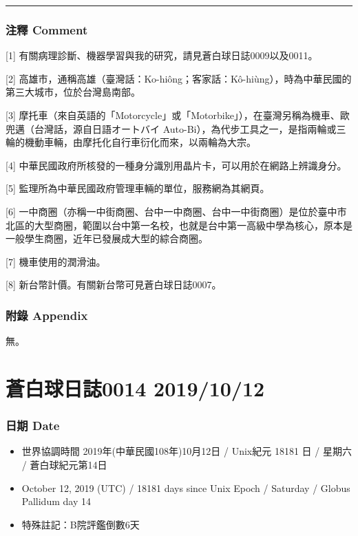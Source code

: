 \documentclass[
]{article}
\providecommand{\tightlist}{%
  \setlength{\itemsep}{0pt}\setlength{\parskip}{0pt}}
\begin{document}
\begin{center}\rule{0.5\linewidth}{\linethickness}\end{center}

\hypertarget{ux6ce8ux91cb-comment-6}{%
\subsubsection{注釋 Comment}\label{ux6ce8ux91cb-comment-6}}

{[}1{]} 有關病理診斷、機器學習與我的研究，請見蒼白球日誌0009以及0011。

{[}2{]}
高雄市，通稱高雄（臺灣話：Ko-hiông；客家話：Kô-hiùng），時為中華民國的第三大城市，位於台灣島南部。

{[}3{]}
摩托車（來自英語的「Motorcycle」或「Motorbike」），在臺灣另稱為機車、歐兜邁（台灣話，源自日語オートバイ
Auto-Bi），為代步工具之一，是指兩輪或三輪的機動車輛，由摩托化自行車衍化而來，以兩輪為大宗。

{[}4{]}
中華民國政府所核發的一種身分識別用晶片卡，可以用於在網路上辨識身分。

{[}5{]} 監理所為中華民國政府管理車輛的單位，服務網為其網頁。

{[}6{]}
一中商圈（亦稱一中街商圈、台中一中商圈、台中一中街商圈）是位於臺中市北區的大型商圈，範圍以台中第一名校，也就是台中第一高級中學為核心，原本是一般學生商圈，近年已發展成大型的綜合商圈。

{[}7{]} 機車使用的潤滑油。

{[}8{]} 新台幣計價。有關新台幣可見蒼白球日誌0007。

\hypertarget{ux9644ux9304-appendix-5}{%
\subsubsection{附錄 Appendix}\label{ux9644ux9304-appendix-5}}

無。

\hypertarget{ux84bcux767dux7403ux65e5ux8a8c0014-20191012}{%
\section{蒼白球日誌0014
2019/10/12}\label{ux84bcux767dux7403ux65e5ux8a8c0014-20191012}}

\hypertarget{ux65e5ux671f-date-11}{%
\subsubsection{日期 Date}\label{ux65e5ux671f-date-11}}

\begin{itemize}
\tightlist
\item
  世界協調時間 2019年(中華民國108年)10月12日 / Unix紀元 18181 日 /
  星期六 / 蒼白球紀元第14日
\item
  October 12, 2019 (UTC) / 18181 days since Unix Epoch / Saturday /
  Globus Pallidum day 14
\item
  特殊註記：B院評鑑倒數6天
\end{itemize}
\end{document}
